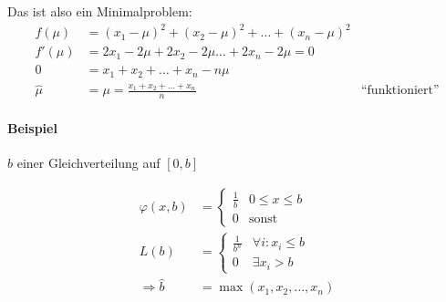 \documentclass[10pt,a4paper]{scrartcl}
\newif\ifincludeExamples
\DeclareMathOperator{\var}{var}
\begin{document}
Das ist also ein Minimalproblem:
\begin{align*}
  f(\mu) &= (x_1-\mu)^2 + (x_2-\mu)^2 + \dots + (x_n-\mu)^2 \\
  f'(\mu) &= 2x_1 - 2\mu + 2x_2 - 2\mu \dots + 2x_n - 2\mu = 0 \\
        0 &= x_1 + x_2 + \dots + x_n - n\mu \\
\hat{\mu} &= \mu = \frac{x_1+x_2+\dots+x_n}{n} & \text{``funktioniert''}
\end{align*}
\fi
\ifincludeExamples
\paragraph{Beispiel} $\lambda$ einer Poisson-Verteilung

Aus dem Katalog:
\begin{align*}
  \lambda = E(X), \qquad \lambda = \var(X)
\end{align*}

\begin{align*}
  \text{Poissonverteilung: } \ & P(X=k) = e^{-\lambda} \frac{\lambda^k}{k!} \\
  \text{Messdaten: }\ & k_1, k_2, \dots k_n \\
  \text{Likelihood-Funktion: }\ & L(\lambda) = e^{-\lambda} \frac{\lambda^k_1}{k_1!} e^{-\lambda} \frac{\lambda^k_2}{k_2!} \cdots 
            e^{-\lambda} \frac{\lambda^k_n}{k_n!}
          = \frac{1}{k_1!k_2!\cdots k_n!}\, e^{-n\lambda}\, \lambda^{k_1+k_2+\dots+k_n}
\end{align*}
\begin{align*}
  k_1!k_2!\cdots k_n! L'(\lambda) &= -n e^{-n\lambda} \lambda^{k_1+\dots+k_n} + e^{-n\lambda} 
        (k_1+\dots+k_n) \lambda^{k_1+\dots+k_n - 1} = 0 \\
    &\Leftrightarrow \underbrace{e^{-n\lambda}}_{\neq 0} \underbrace{\lambda^{k_1+\dots+k_n - 1}}_{\neq 0} 
      \underbrace{(-n\lambda + k_1+\dots+k_n)}_{\stackrel{!}{=}0} = 0 \\
      \hat{\lambda} &= \lambda = \frac{k_1 + k_2 + \dots + k_n}{n} & \text{``funktioniert''}
\end{align*}
\fi
\ifincludeExamples
\paragraph{Beispiel} $b$ einer Gleichverteilung auf $[0, b]$

\begin{align*}
  \varphi(x, b) &= \begin{cases} \frac{1}{b} & 0 \le x \le b \\ 0 & \text{sonst}\end{cases} \\
  L(b) &= \begin{cases} \frac{1}{b^n} & \forall i:  x_i \le b \\ 0 & \exists x_i > b\end{cases} \\
  \Rightarrow \hat{b} & = \max(x_1, x_2, \dots, x_n)
\end{align*}
\end{document}
